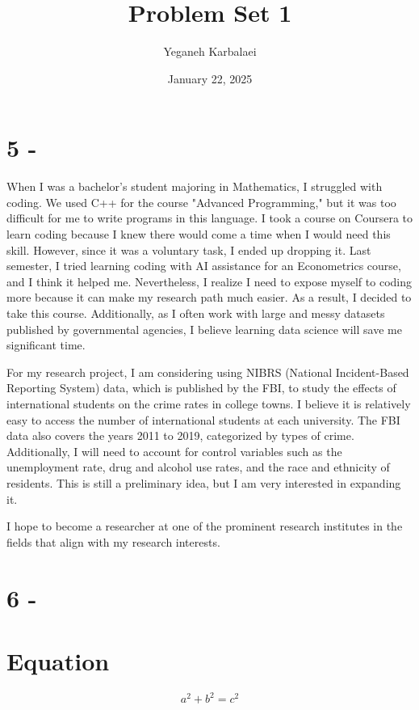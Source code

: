 \documentclass{article}
\title{Problem Set 1}
\author{Yeganeh Karbalaei}
\date{January 22, 2025}
\begin{document}
\maketitle

\section*{5 -} 
\noindent\Large When I was a bachelor’s student majoring in Mathematics, I struggled with coding. We used C++ for the course "Advanced Programming," but it was too difficult for me to write programs in this language. I took a course on Coursera to learn coding because I knew there would come a time when I would need this skill. However, since it was a voluntary task, I ended up dropping it. Last semester, I tried learning coding with AI assistance for an Econometrics course, and I think it helped me. Nevertheless, I realize I need to expose myself to coding more because it can make my research path much easier. As a result, I decided to take this course. Additionally, as I often work with large and messy datasets published by governmental agencies, I believe learning data science will save me significant time.

For my research project, I am considering using NIBRS (National Incident-Based Reporting System) data, which is published by the FBI, to study the effects of international students on the crime rates in college towns. I believe it is relatively easy to access the number of international students at each university. The FBI data also covers the years 2011 to 2019, categorized by types of crime. Additionally, I will need to account for control variables such as the unemployment rate, drug and alcohol use rates, and the race and ethnicity of residents. This is still a preliminary idea, but I am very interested in expanding it.

I hope to become a researcher at one of the prominent research institutes in the fields that align with my research interests.

\section*{6 -}
\section*{Equation}
\begin{equation}
a^2 + b^2 = c^2
\end{equation}
\end{document}
